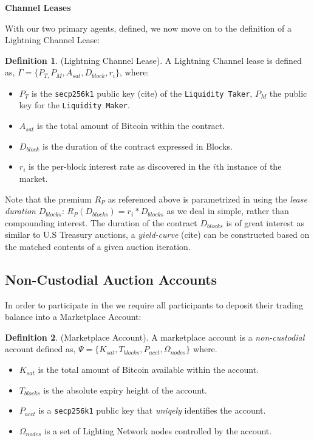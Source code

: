 \documentclass[12pt,a4paper]{article}
\theoremstyle{definition}
\newtheorem{definition}{Definition}[section]
\begin{document}
\begin{center}
\textbf{Channel Leases}
\end{center}

With our two primary agents, defined, we now move on to the definition of a
Lightning Channel Lease: 

\begin{definition}{(Lightning Channel Lease).} 
    A Lightning Channel lease is defined as, $\Gamma = \{P_{T,} P_{M}, A_{sat},
    D_{block}, r_{i} \}$, where:
\end{definition}

\begin{itemize}
    \item $P_{T}$ is the \texttt{secp256k1} public key (cite) of the
\texttt{Liquidity Taker}, $P_{M}$ the public key for the \texttt{Liquidity
Maker}. 
    \item $A_{sat}$ is the total amount of Bitcoin within the contract.
    \item $D_{block}$ is the duration of the contract expressed in Blocks.
    \item $r_{i}$ is the per-block interest rate as discovered in the $i$th
    instance of the market.
\end{itemize}

Note that the premium $R_{P}$ as referenced above is parametrized in using the
\emph{lease duration} $D_{blocks}$: $R_{P}(D_{blocks}) = r_i * D_{blocks}$ as
we deal in simple, rather than compounding interest.  The duration of the
contract $D_{blocks}$ is of great interest as similar to U.S Treasury auctions,
a \emph{yield-curve} (cite) can be constructed based on the matched contents of
a given auction iteration. %


\subsection{Non-Custodial Auction Accounts}

In order to participate in the we require all participants to deposit their
trading balance into a Marketplace Account:

\theoremstyle{definition}
\begin{definition}{(Marketplace Account).}
A marketplace account is a \emph{non-custodial} account defined as, $\Psi =
\{K_{sat}, T_{blocks}, P_{acct}, \Omega_{nodes} \}$ where.
\end{definition}

\begin{itemize}
    \item $K_{sat}$ is the total amount of Bitcoin available within the account.
    \item $T_{blocks}$ is the absolute expiry height of the account. 
    \item $P_{acct}$ is a \texttt{secp256k1} public key  that \emph{uniqely} identifies the account.
    \item $\Omega_{nodes}$ is a set of Lighting Network nodes controlled by the account.
\end{itemize}
\end{document}
